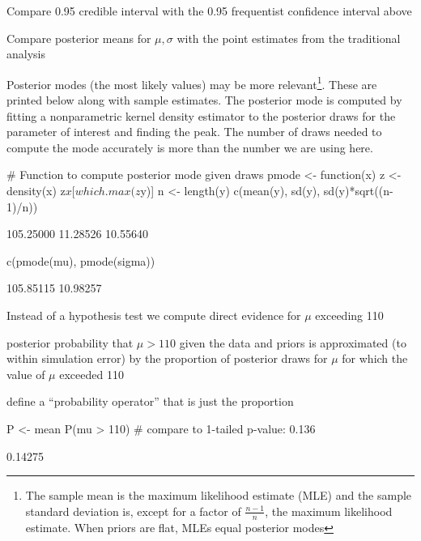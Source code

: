\item Compare 0.95 credible interval with the 0.95
  frequentist confidence interval above
\item Compare posterior means for $\mu, \sigma$ with the point estimates from
  the traditional analysis
  \bi
  \item Posterior modes (the most likely values) may be more
 relevant\footnote{The sample mean is the maximum likelihood estimate (MLE) and the sample standard deviation is, except for a factor of $\frac{n-1}{n}$, the maximum likelihood estimate.  When priors are flat, MLEs equal posterior modes}.  These are printed below along with
    sample estimates.  The posterior mode is computed by fitting a
    nonparametric kernel density estimator to the posterior draws for
    the parameter of interest and finding the peak.  The number of
    draws needed to compute the mode accurately is more than the
    number we are using here.
  \ei
\begin{Schunk}
\begin{Sinput}
# Function to compute posterior mode given draws
pmode <- function(x) {
  z <- density(x)
  z$x[which.max(z$y)]
  }
n <- length(y)
c(mean(y), sd(y), sd(y)*sqrt((n-1)/n))
\end{Sinput}
\begin{Soutput}
[1] 105.25000  11.28526  10.55640
\end{Soutput}
\begin{Sinput}
c(pmode(mu), pmode(sigma))
\end{Sinput}
\begin{Soutput}
[1] 105.85115  10.98257
\end{Soutput}
\end{Schunk}
\item Instead of a hypothesis test we compute direct evidence for
  $\mu$ exceeding 110
  \bi
  \item posterior probability that $\mu > 110$ given the data and
    priors is approximated (to within simulation error) by the
    proportion of posterior draws for $\mu$ for which the value of
    $\mu$ exceeded 110
  \item define a ``probability operator''  that is just the proportion
  \ei
\ei

\begin{Schunk}
\begin{Sinput}
P <- mean
P(mu > 110)   # compare to 1-tailed p-value: 0.136
\end{Sinput}
\begin{Soutput}
[1] 0.14275
\end{Soutput}
\end{Schunk}


